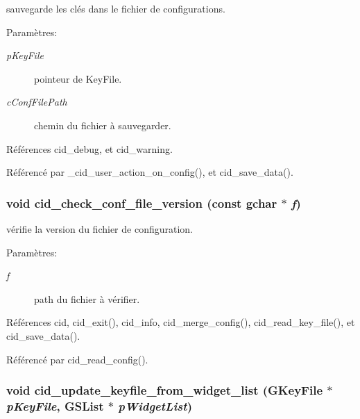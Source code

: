 sauvegarde les clés dans le fichier de configurations. \begin{Desc}
\item[Paramètres:]
\begin{description}
\item[{\em pKeyFile}]pointeur de KeyFile. \item[{\em cConfFilePath}]chemin du fichier à sauvegarder. \end{description}
\end{Desc}


Références cid\_\-debug, et cid\_\-warning.

Référencé par \_\-cid\_\-user\_\-action\_\-on\_\-config(), et cid\_\-save\_\-data().
\subsubsection{\setlength{\rightskip}{0pt plus 5cm}void cid\_\-check\_\-conf\_\-file\_\-version (const gchar $\ast$ {\em f})}\label{cid-config_8h_8649145737989647a1fb2ebc8e8e9f74}


vérifie la version du fichier de configuration. \begin{Desc}
\item[Paramètres:]
\begin{description}
\item[{\em f}]path du fichier à vérifier. \end{description}
\end{Desc}


Références cid, cid\_\-exit(), cid\_\-info, cid\_\-merge\_\-config(), cid\_\-read\_\-key\_\-file(), et cid\_\-save\_\-data().

Référencé par cid\_\-read\_\-config().
\subsubsection{\setlength{\rightskip}{0pt plus 5cm}void cid\_\-update\_\-keyfile\_\-from\_\-widget\_\-list (GKeyFile $\ast$ {\em pKeyFile}, \/  GSList $\ast$ {\em pWidgetList})}\label{cid-config_8h_b0b7d2c2182a54ad3ae6fd16f7b3978a}




